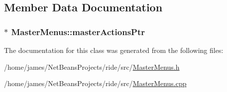 \subsection{Member Data Documentation}
\hypertarget{class_master_menus_ab5ba9c46b8ad0e6eb11345e055ac469d}{
\subsubsection[{master\-Actions\-Ptr}]{$\ast$ Master\-Menus\-::master\-Actions\-Ptr\hspace{0.3cm}{\ttfamily [private]}}}\label{class_master_menus_ab5ba9c46b8ad0e6eb11345e055ac469d}


The documentation for this class was generated from the following files\-:\begin{DoxyCompactItemize}
\item 
/home/james/\-Net\-Beans\-Projects/ride/src/\hyperlink{_master_menus_8h}{Master\-Menus.\-h}\item 
/home/james/\-Net\-Beans\-Projects/ride/src/\hyperlink{_master_menus_8cpp}{Master\-Menus.\-cpp}\end{DoxyCompactItemize}
